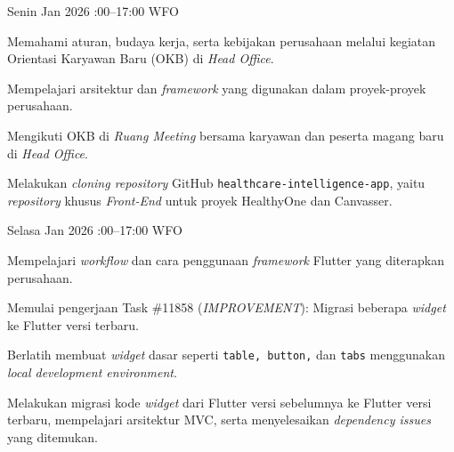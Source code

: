 \renewcommand{\reportmonth}{Januari}
\renewcommand{\signaturedate}{1 Februari 2026}

\begin{logtable}

    {
        Senin  Jan 2026 :00--17:00 \linebreak
        WFO
    }{
        \begin{loglist}
            \item Memahami aturan, budaya kerja, serta kebijakan perusahaan melalui kegiatan
            Orientasi Karyawan Baru (OKB) di \textit{Head Office}.
            \item Mempelajari arsitektur dan \textit{framework} yang digunakan dalam
            proyek-proyek perusahaan.
        \end{loglist}
    }{
        \begin{logwork}
            \item Mengikuti OKB di \textit{Ruang Meeting} bersama karyawan dan peserta magang
            baru di \textit{Head Office}.
            \item Melakukan \textit{cloning repository} GitHub
            \texttt{healthcare-intelligence-app}, yaitu \textit{repository} khusus
            \textit{Front-End} untuk proyek HealthyOne dan Canvasser.
        \end{logwork}
    }

    {
        Selasa  Jan 2026 :00--17:00 \linebreak
        WFO
    }{
        \begin{loglist}
            \item Mempelajari \textit{workflow} dan cara penggunaan \textit{framework} Flutter
            yang diterapkan perusahaan.
            \item Memulai pengerjaan Task \#11858 (\textit{IMPROVEMENT}): Migrasi beberapa
            \textit{widget} ke Flutter versi terbaru.
        \end{loglist}
    }{
        \begin{logwork}
            \item Berlatih membuat \textit{widget} dasar seperti \texttt{table, button,} dan
            \texttt{tabs} menggunakan \textit{local development environment}.
            \item Melakukan migrasi kode \textit{widget} dari Flutter versi sebelumnya ke Flutter
            versi terbaru, mempelajari arsitektur MVC, serta menyelesaikan
            \textit{dependency issues} yang ditemukan.
        \end{logwork}
    }


\end{logtable}
